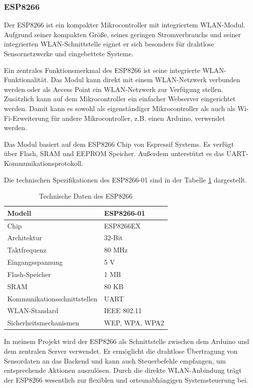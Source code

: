 \documentclass[12pt, letterpaper]{article}
\begin{document}
  \subsubsection{ESP8266}
  \par Der ESP8266 ist ein kompakter Mikrocontroller mit integriertem WLAN-Modul. Aufgrund seiner kompakten Größe, seines geringen Stromverbrauchs und seiner integrierten WLAN-Schnittstelle eignet er sich besonders für drahtlose Sensornetzwerke und eingebettete Systeme.
  \par Ein zentrales Funktionsmerkmal des ESP8266 ist seine integrierte WLAN-Funktionalität. Das Modul kann direkt mit einem WLAN-Netzwerk verbunden werden oder als Access Point ein WLAN-Netzwerk zur Verfügung stellen. Zusätzlich kann auf dem Mikrocontroller ein einfacher Webserver eingerichtet werden. Damit kann es sowohl als eigenständiger Mikrocontroller als auch als Wi-Fi-Erweiterung für andere Mikrocontroller, z.B. einen Arduino, verwendet werden. 
  \par Das Modul basiert auf dem ESP8266 Chip von Espressif Systems. Es verfügt über Flash, SRAM und EEPROM Speicher. Außerdem unterstützt es das UART-Kommunikationsprotokoll.
  \par Die technischen Spezifikationen des ESP8266-01 sind in der Tabelle \ref{tab:esp8266td} dargestellt.

  \begin{table}[h]
  \centering
  \begin{tabular}{|l|l|}
  \hline
  Modell & ESP8266-01 \\ \hline
  Chip & ESP8266EX \\ \hline
  Architektur & 32-Bit \\ \hline
  Taktfrequenz & 80 MHz \\ \hline
  Eingangsspannung & 5 V \\ \hline
  Flash-Speicher & 1 MB \\ \hline
  SRAM & 80 KB \\ \hline
  Kommunikationsschnittstellen & UART \\ \hline
  WLAN-Standard & IEEE 802.11 \\ \hline
  Sicherheitsmechanismen & WEP, WPA, WPA2 \\ \hline
  \end{tabular}
  \caption{Technische Daten des ESP8266}
  \label{tab:esp8266td}
  \end{table}
  \par In meinem Projekt wird der ESP8266 als Schnittstelle zwischen dem Arduino und dem zentralen Server verwendet. Er ermöglicht die drahtlose Übertragung von Sensordaten an das Backend und kann auch Steuerbefehle empfangen, um entsprechende Aktionen auszulösen. Durch die direkte WLAN-Anbindung trägt der ESP8266 wesentlich zur flexiblen und ortsunabhängigen Systemsteuerung bei.
\end{document}
